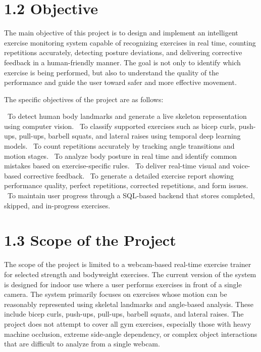 \documentclass[12pt,a4paper]{report}
\begin{document}
\section{1.2 Objective}
The main objective of this project is to design and implement an intelligent exercise monitoring system capable of recognizing exercises in real time, counting repetitions accurately, detecting posture deviations, and delivering corrective feedback in a human-friendly manner. The goal is not only to identify which exercise is being performed, but also to understand the quality of the performance and guide the user toward safer and more effective movement.

The specific objectives of the project are as follows:

\noindent\textbullet\ To detect human body landmarks and generate a live skeleton representation using computer vision.
\noindent\textbullet\ To classify supported exercises such as bicep curls, push-ups, pull-ups, barbell squats, and lateral raises using temporal deep learning models.
\noindent\textbullet\ To count repetitions accurately by tracking angle transitions and motion stages.
\noindent\textbullet\ To analyze body posture in real time and identify common mistakes based on exercise-specific rules.
\noindent\textbullet\ To deliver real-time visual and voice-based corrective feedback.
\noindent\textbullet\ To generate a detailed exercise report showing performance quality, perfect repetitions, corrected repetitions, and form issues.
\noindent\textbullet\ To maintain user progress through a SQL-based backend that stores completed, skipped, and in-progress exercises.

\section{1.3 Scope of the Project}
The scope of the project is limited to a webcam-based real-time exercise trainer for selected strength and bodyweight exercises. The current version of the system is designed for indoor use where a user performs exercises in front of a single camera. The system primarily focuses on exercises whose motion can be reasonably represented using skeletal landmarks and angle-based analysis. These include bicep curls, push-ups, pull-ups, barbell squats, and lateral raises. The project does not attempt to cover all gym exercises, especially those with heavy machine occlusion, extreme side-angle dependency, or complex object interactions that are difficult to analyze from a single webcam.
\end{document}
